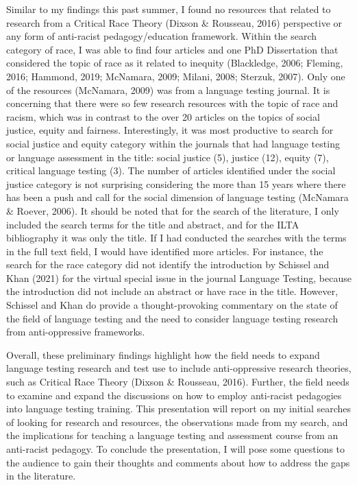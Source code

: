 \documentclass[
]{book}
\begin{document}
Similar to my findings this past summer, I found no resources that related to research from a Critical Race Theory (Dixson \& Rousseau, 2016) perspective or any form of anti-racist pedagogy/education framework. Within the search category of race, I was able to find four articles and one PhD Dissertation that considered the topic of race as it related to inequity (Blackledge, 2006; Fleming, 2016; Hammond, 2019; McNamara, 2009; Milani, 2008; Sterzuk, 2007). Only one of the resources (McNamara, 2009) was from a language testing journal. It is concerning that there were so few research resources with the topic of race and racism, which was in contrast to the over 20 articles on the topics of social justice, equity and fairness. Interestingly, it was most productive to search for social justice and equity category within the journals that had language testing or language assessment in the title: social justice (5), justice (12), equity (7), critical language testing (3). The number of articles identified under the social justice category is not surprising considering the more than 15 years where there has been a push and call for the social dimension of language testing (McNamara \& Roever, 2006). It should be noted that for the search of the literature, I only included the search terms for the title and abstract, and for the ILTA bibliography it was only the title. If I had conducted the searches with the terms in the full text field, I would have identified more articles. For instance, the search for the race category did not identify the introduction by Schissel and Khan (2021) for the virtual special issue in the journal Language Testing, because the introduction did not include an abstract or have race in the title. However, Schissel and Khan do provide a thought-provoking commentary on the state of the field of language testing and the need to consider language testing research from anti-oppressive frameworks.

Overall, these preliminary findings highlight how the field needs to expand language testing research and test use to include anti-oppressive research theories, such as Critical Race Theory (Dixson \& Rousseau, 2016). Further, the field needs to examine and expand the discussions on how to employ anti-racist pedagogies into language testing training.
This presentation will report on my initial searches of looking for research and resources, the observations made from my search, and the implications for teaching a language testing and assessment course from an anti-racist pedagogy. To conclude the presentation, I will pose some questions to the audience to gain their thoughts and comments about how to address the gaps in the literature.
\end{document}
